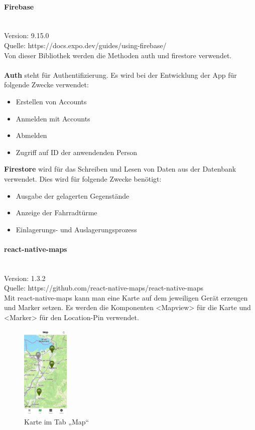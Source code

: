 \bigskip

\paragraph{Firebase}\mbox{}\\
Version: 9.15.0\\
Quelle: https://docs.expo.dev/guides/using-firebase/\\
Von dieser Bibliothek werden die Methoden auth und firestore verwendet.\\\\

\textbf{Auth} steht für Authentifizierung. Es wird bei der Entwicklung der App für folgende Zwecke verwendet:
\begin{itemize}
  \item Erstellen von Accounts
  \item Anmelden mit Accounts
  \item Abmelden
  \item Zugriff auf ID der anwendenden Person
\end{itemize}

\noindent\textbf{Firestore} wird für das Schreiben und Lesen von Daten aus der Datenbank verwendet. Dies wird für folgende Zwecke benötigt:

\begin{itemize}
  \item Ausgabe der gelagerten Gegenstände
  \item Anzeige der Fahrradtürme
  \item Einlagerungs- und Auslagerungsprozess
\end{itemize}

\bigskip

\paragraph{react-native-maps}\mbox{}\\
Version: 1.3.2\\
Quelle: https://github.com/react-native-maps/react-native-maps\\
Mit react-native-maps kann man eine Karte auf dem jeweiligen Gerät erzeugen und Marker setzen. Es werden die Komponenten <Mapview> für die Karte und <Marker> für den \Gls{Location-Pin} verwendet.

\begin{figure}[H]
  \centering
  \includegraphics[width=0.2\textwidth]{images/app-screenshots/tabmap.jpg}
  \caption{Karte im Tab „Map“}
  \label{fig:tabmap}
\end{figure}

